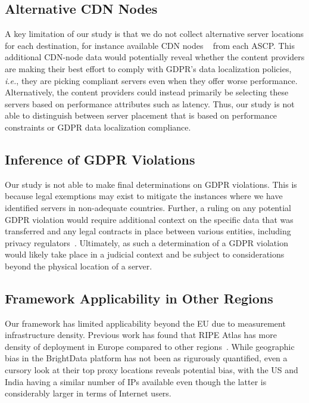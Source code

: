 \subsection{Alternative CDN Nodes}
A key limitation of our study 
is that we do not collect alternative server locations
for each destination, for instance available CDN nodes
~\cite{10.1145/1159913.1159962} from each ASCP.
This additional CDN-node data
would  potentially reveal whether the content providers are making their best effort to
comply with GDPR's data localization policies, \textit{i.e.}, they are
picking compliant servers even when they offer worse performance.
Alternatively, the content providers could instead primarily be selecting these servers
based on performance attributes such as latency.
Thus, our study is not able to distinguish between 
server placement that is based on performance constraints or
GDPR data localization compliance.

\subsection{Inference of GDPR Violations}

Our study is not able to make final determinations on GDPR violations. 
This is because legal exemptions may exist to mitigate the instances
where we have identified servers in non-adequate countries.
Further, a ruling on any potential GDPR violation would require additional
context on the specific data that was transferred and any legal contracts
in place between various entities, including privacy regulators~\cite{sccs}.
Ultimately, as such a determination of a GDPR violation would likely 
take place in a judicial context and be subject
to considerations beyond the physical location of a server. 

\subsection{Framework Applicability in Other Regions}
Our framework has limited applicability beyond the EU due to measurement
infrastructure density. Previous work has found that 
RIPE Atlas has more density of
deployment in Europe compared to other regions~\cite{ripeatlasbias,10198985}.
While geographic bias in the BrightData platform has not been as rigurously
quantified, even a cursory look at their top proxy locations reveals potential bias,
with the US and India having a similar number of IPs available even though the
latter is considerably larger in terms of Internet users.~\cite{topproxylocations}




